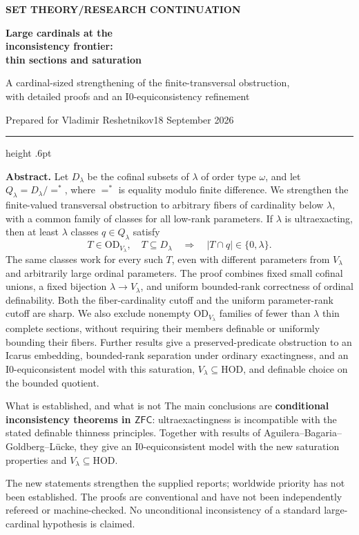 \documentclass[11pt,letterpaper]{article}
\theoremstyle{definition}
\newcommand{\ZFC}{\mathsf{ZFC}}
\newcommand{\HOD}{\mathrm{HOD}}
\newcommand{\OD}{\mathrm{OD}}
\newcommand{\Izero}{\mathrm{I0}}
\numberwithin{equation}{section}
\newcommand{\eqfin}{\mathrel{=^{*}}}
\begin{document}
\thispagestyle{empty}
{\sffamily\bfseries\small\color{Olive}SET THEORY\quad /\quad RESEARCH CONTINUATION}

\vspace{13pt}
{\fontsize{28}{31}\selectfont\bfseries\color{Forest}Large cardinals at the\\ inconsistency frontier:\\ thin sections and saturation\par}
\vspace{10pt}
{\fontsize{14}{18}\selectfont A cardinal-sized strengthening of the finite-transversal obstruction,\\ with detailed proofs and an $\Izero$-equiconsistency refinement\par}
\vspace{14pt}
{\color{Muted}Prepared for Vladimir Reshetnikov\hfill 18 September 2026\par}
\vspace{3pt}
{\color{Sage}\hrule height .6pt}
\vspace{12pt}

\textbf{Abstract.}
Let $D_\lambda$ be the cofinal subsets of $\lambda$ of order type $\omega$, and let
$Q_\lambda=D_\lambda/{\eqfin}$, where $\eqfin$ is equality modulo finite difference.
We strengthen the finite-valued transversal obstruction to arbitrary fibers of
cardinality below $\lambda$, with a common family of classes for all low-rank
parameters. If $\lambda$ is ultraexacting, then at least $\lambda$ classes
$q\in Q_\lambda$ satisfy
\[
  T\in\OD_{V_\lambda},\quad T\subseteq D_\lambda
  \quad\Longrightarrow\quad |T\cap q|\in\{0,\lambda\}.
\]
The same classes work for every such $T$, even with different parameters from
$V_\lambda$ and arbitrarily large ordinal parameters. The proof combines fixed
small cofinal unions, a fixed bijection $\lambda\to V_\lambda$, and uniform
bounded-rank correctness of ordinal definability. Both the fiber-cardinality
cutoff and the uniform parameter-rank cutoff are sharp. We also exclude
nonempty $\OD_{V_\lambda}$ families of fewer than $\lambda$ thin complete
sections, without requiring their members definable or uniformly bounding
their fibers. Further results give a preserved-predicate obstruction to an
Icarus embedding, bounded-rank separation under ordinary exactingness, and
an $\Izero$-equiconsistent model with this saturation, $V_\lambda\subseteq\HOD$,
and definable choice on the bounded quotient.

\begin{assessment}{What is established, and what is not}
The main conclusions are \textbf{conditional inconsistency theorems in $\ZFC$}:
ultraexactingness is incompatible with the stated definable thinness principles.
Together with results of Aguilera--Bagaria--Goldberg--L\"ucke, they give
an $\Izero$-equiconsistent model with the new saturation properties and
$V_\lambda\subseteq\HOD$.

The new statements strengthen the supplied reports; worldwide priority has not
been established. The proofs are conventional and have not been independently
refereed or machine-checked. No unconditional inconsistency of a standard
large-cardinal hypothesis is claimed.
\end{assessment}
\end{document}

